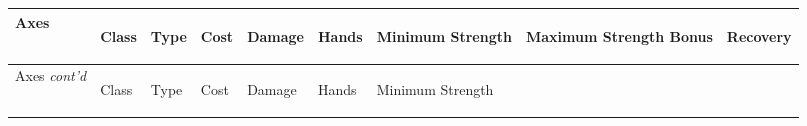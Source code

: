 \documentclass[twoside]{book}
\begin{document}
\begin{longtable}{p{1.25in}llllp{2em}p{3em}p{3em}l} 
  Axes
  &
  \begin{turn}{70}{Class}\end{turn}
          
  &
  \begin{turn}{70}{Type}\end{turn}
          
  &
  \begin{turn}{70}{Cost}\end{turn}
          
  &
  \begin{turn}{70}{Damage}\end{turn}
          
  &
  \begin{turn}{70}{Hands}\end{turn}
          
  &
  \begin{turn}{70}{Minimum Strength}\end{turn}
          
  &
  \begin{turn}{70}{Maximum Strength Bonus}\end{turn}
          
  &
  \begin{turn}{70}{Recovery}\end{turn}
          
  \\
  \hline
  \hline
  \endfirsthead
  Axes \textit{cont'd}
        
  &
  \begin{turn}{70}{Class}\end{turn}
          
  &
  \begin{turn}{70}{Type}\end{turn}
          
  &
  \begin{turn}{70}{Cost}\end{turn}
          
  &
  \begin{turn}{70}{Damage}\end{turn}
          
  &
  \begin{turn}{70}{Hands}\end{turn}
          
  &
  \begin{turn}{70}{Minimum Strength}\end{turn}
          

\end{longtable}
\end{document}

